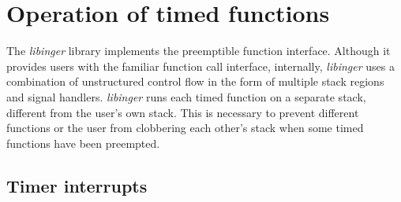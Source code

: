 \section{Operation of timed functions}
\label{sec:libinger}

%
%
%
%

The \textit{libinger} library implements the preemptible function interface. Although
it provides users with the familiar function call interface, internally,
\textit{libinger} uses a combination of unstructured control flow in the form of
multiple stack regions and signal handlers. \textit{libinger} runs each timed
function on a separate stack, different from the user's own stack. This is
necessary to prevent different functions or the user from clobbering each
other's stack when some timed functions have been preempted.

\subsection{Timer interrupts}


